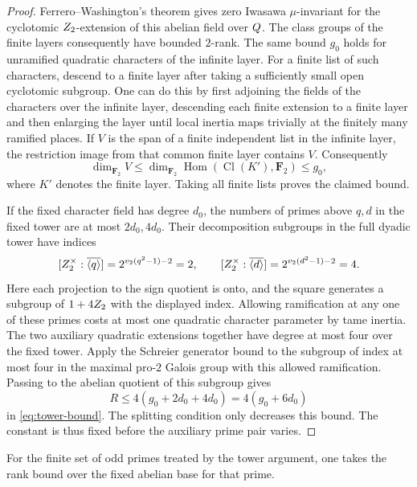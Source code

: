 \begin{proof}
Ferrero--Washington's theorem gives zero Iwasawa \(\mu\)-invariant
for the cyclotomic \(Z_2\)-extension of this abelian field
over \(Q\). The class groups of the finite layers consequently
have bounded \(2\)-rank. The same bound \(g_0\) holds for
unramified quadratic characters of the infinite layer.
For a finite list of such characters, descend to a finite layer
after taking a sufficiently small open cyclotomic subgroup.
One can do this by first adjoining the fields of the characters
over the infinite layer, descending each finite extension to a
finite layer and then enlarging the layer until local inertia
maps trivially at the finitely many ramified places.
If \(V\) is the span of a finite independent list in the infinite layer, the restriction image from that common finite layer contains \(V\). Consequently
\[
 \dim_{\mathbf F_2} V\le
 \dim_{\mathbf F_2}\operatorname{Hom}(\operatorname{Cl}(K'),\mathbf F_2)
 \le g_0 ,
\]
where \(K'\) denotes the finite layer. Taking all finite lists proves the claimed bound.
\hfill\mbox{\cite{ferrero-washington}}

If the fixed character field has degree \(d_0\), the numbers of
primes above \(q,d\) in the fixed tower are at most \(2d_0,4d_0\).
Their decomposition subgroups in the full dyadic tower have
indices
\[
    [Z_2^\times:\overline{\langle q\rangle}]
      =2^{v_2(q^2-1)-2}=2,\qquad
    [Z_2^\times:\overline{\langle d\rangle}]
      =2^{v_2(d^2-1)-2}=4 .
\]
Here each projection to the sign quotient is onto, and the square
generates a subgroup of \(1+4Z_2\) with the displayed index.
Allowing ramification at any one of these primes costs at most
one quadratic character parameter by tame inertia.
The two auxiliary quadratic extensions together have degree at
most four over the fixed tower. Apply the Schreier generator
bound to the subgroup of index at most four in the maximal
pro-\(2\) Galois group with this allowed ramification. Passing to the abelian quotient of this subgroup gives
\[
  R\le 4(g_0+2d_0+4d_0)=4(g_0+6d_0)
\]
in \eqref{eq:tower-bound}.
The splitting condition only decreases this bound. The constant
is thus fixed before the auxiliary prime pair varies.
\end{proof}

For the finite set of odd primes treated by the tower argument,
one takes the rank bound over the fixed abelian base for that
prime.

